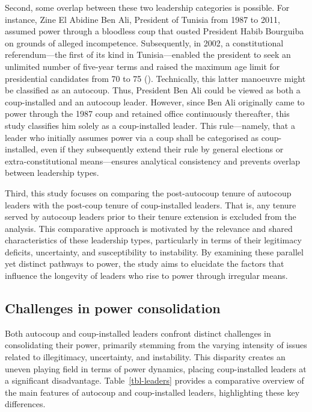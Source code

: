 \documentclass[
  12pt,
]{report}
\begin{document}
Second, some overlap between these two leadership categories is
possible. For instance, Zine El Abidine Ben Ali, President of Tunisia
from 1987 to 2011, assumed power through a bloodless coup that ousted
President Habib Bourguiba on grounds of alleged incompetence.
Subsequently, in 2002, a constitutional referendum---the first of its
kind in Tunisia---enabled the president to seek an unlimited number of
five-year terms and raised the maximum age limit for presidential
candidates from 70 to 75 (). Technically, this latter manoeuvre might be classified as an
autocoup. Thus, President Ben Ali could be viewed as both a
coup-installed and an autocoup leader. However, since Ben Ali originally
came to power through the 1987 coup and retained office continuously
thereafter, this study classifies him solely as a coup-installed leader.
This rule---namely, that a leader who initially assumes power via a coup
shall be categorised as coup-installed, even if they subsequently extend
their rule by general elections or extra-constitutional means---ensures
analytical consistency and prevents overlap between leadership types.

Third, this study focuses on comparing the post-autocoup tenure of
autocoup leaders with the post-coup tenure of coup-installed leaders.
That is, any tenure served by autocoup leaders prior to their tenure
extension is excluded from the analysis. This comparative approach is
motivated by the relevance and shared characteristics of these
leadership types, particularly in terms of their legitimacy deficits,
uncertainty, and susceptibility to instability. By examining these
parallel yet distinct pathways to power, the study aims to elucidate the
factors that influence the longevity of leaders who rise to power
through irregular means.

\subsection{Challenges in power
consolidation}\label{challenges-in-power-consolidation}

Both autocoup and coup-installed leaders confront distinct challenges in
consolidating their power, primarily stemming from the varying intensity
of issues related to illegitimacy, uncertainty, and instability. This
disparity creates an uneven playing field in terms of power dynamics,
placing coup-installed leaders at a significant disadvantage.
Table~\ref{tbl-leaders} provides a comparative overview of the main
features of autocoup and coup-installed leaders, highlighting these key
differences.
\end{document}
